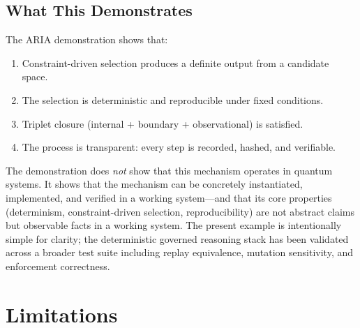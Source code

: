 \documentclass[12pt]{article}
\begin{document}
\subsection{What This Demonstrates}

The ARIA demonstration shows that:
\begin{enumerate}
    \item Constraint-driven selection produces a definite output from a candidate space.
    \item The selection is deterministic and reproducible under fixed conditions.
    \item Triplet closure (internal + boundary + observational) is satisfied.
    \item The process is transparent: every step is recorded, hashed, and verifiable.
\end{enumerate}

The demonstration does \textit{not} show that this mechanism operates in quantum systems. It shows that the mechanism can be concretely instantiated, implemented, and verified in a working system---and that its core properties (determinism, constraint-driven selection, reproducibility) are not abstract claims but observable facts in a working system. The present example is intentionally simple for clarity; the deterministic governed reasoning stack has been validated across a broader test suite including replay equivalence, mutation sensitivity, and enforcement correctness.

\section{Limitations}\label{sec:limitations}
\end{document}
